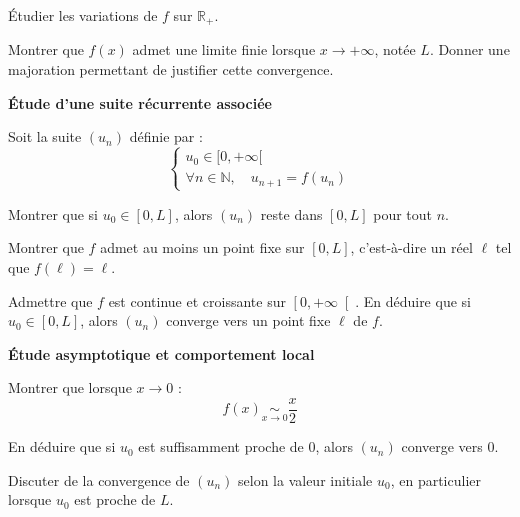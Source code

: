 \documentclass[10pt,a4paper]{article}
\begin{document}
\q Étudier les variations de \( f \) sur \( \mathbb{R}_+ \).

\q Montrer que \( f(x) \) admet une limite finie lorsque \( x \to +\infty \), notée \( L
\). Donner une majoration permettant de justifier cette convergence.

\vspace{0.5cm}

\textbf{Étude d'une suite récurrente associée}

Soit la suite \( (u_n) \) définie par :
\[
\begin{cases}
    u_0 \in [0, +\infty[ \\
    \forall n \in \mathbb{N}, \quad u_{n+1} = f(u_n)
\end{cases}
\]

\q Montrer que si \( u_0 \in [0, L] \), alors \( (u_n) \) reste dans \( [0, L] \) pour tout \( n \).

\q Montrer que \( f \) admet au moins un point fixe sur \( [0, L] \), c'est-à-dire un réel \( \ell
\) tel que \( f(\ell) = \ell \).

\q Admettre que \( f \) est continue et croissante sur \( \left[0, +\infty \right[ \). En déduire
que si \( u_0 \in [0, L] \), alors \( (u_n) \) converge vers un point fixe \( \ell \) de \( f \).

\vspace{0.5cm}

\textbf{Étude asymptotique et comportement local}

\q Montrer que lorsque \( x \to 0 \) :
\[
f(x) \mathop{\sim}\limits_{ x \to 0 } \frac{x}{2}
\]

\q En déduire que si \( u_0 \) est suffisamment proche de 0, alors \( (u_n) \) converge vers 0.

\q Discuter de la convergence de \( (u_n) \) selon la valeur initiale \( u_0 \), en particulier
lorsque \( u_0 \) est proche de \( L \).
\end{document}
